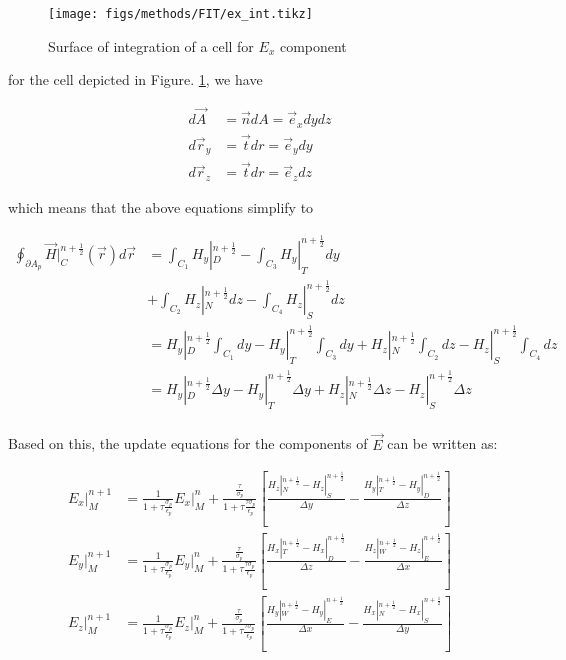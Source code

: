             \begin{figure}[!ht]
                \centering
                \texttt{[image: figs/methods/FIT/ex\_int.tikz]}
                \caption{Surface of integration of a cell for $E_x$ component}
                \label{fig:Ex_Int}
            \end{figure}

            for the cell depicted in Figure. \ref{fig:Ex_Int}, we have

            \begin{align}
                d\vec{A} &= \vec{n}dA = \vec{e}_xdydz \\
                d\vec{r}_y &= \vec{t}dr = \vec{e}_ydy \\
                d\vec{r}_z &= \vec{t}dr = \vec{e}_zdz
            \end{align}

            which means that the above equations simplify to

            \begin{align}
                \oint_{\partial A_p} \vec{H}|^{n+\frac{1}{2}}_{C}(\vec{r})d\vec{r} &= \int_{C_1}H_y|_D^{n+\frac{1}{2}} - \int_{C_3} H_y|_T^{n+\frac{1}{2}}dy \\
                    &+\int_{C_2}H_z|_{N}^{n+\frac{1}{2}}dz - \int_{C_4}H_z|_{S}^{n+\frac{1}{2}}dz \\
                    &= H_y|_D^{n+\frac{1}{2}}\int_{C_1}dy - H_y|_T^{n+\frac{1}{2}} \int_{C_3} dy +H_z|_{N}^{n+\frac{1}{2}}\int_{C_2}dz - H_z|_{S}^{n+\frac{1}{2}}\int_{C_4}dz\\
                    &= H_y|_D^{n+\frac{1}{2}}\Delta y - H_y|_T^{n+\frac{1}{2}} \Delta y +H_z|_{N}^{n+\frac{1}{2}}\Delta z - H_z|_{S}^{n+\frac{1}{2}}\Delta z\\
            \end{align}

            Based on this, the update equations for the components of $\vec{E}$ can be written as:

            \begin{align}
                E_x|_M^{n+1} &= \frac{1}{1+\tau\frac{\sigma_p}{\epsilon_p}}E_x|_M^n
                    + \frac{\frac{\tau}{\sigma_p}}{1+\tau\frac{\tau\sigma_p}{\epsilon_p}}\left[\frac{H_z|_N^{n+\frac{1}{2}}-H_z|_S^{n+\frac{1}{2}}}{\Delta y}
                    - \frac{H_y|_T^{n+\frac{1}{2}} - H_y|_D^{n+\frac{1}{2}}}{\Delta z}\right]\\
                E_y|_M^{n+1} &= \frac{1}{1+\tau\frac{\sigma_p}{\epsilon_p}}E_y|_M^n
                    + \frac{\frac{\tau}{\sigma_p}}{1+\tau\frac{\tau\sigma_p}{\epsilon_p}}\left[\frac{H_x|_T^{n+\frac{1}{2}}-H_x|_D^{n+\frac{1}{2}}}{\Delta z}
                    - \frac{H_z|_W^{n+\frac{1}{2}} - H_z|_E^{n+\frac{1}{2}}}{\Delta x}\right]\\
                E_z|_M^{n+1} &= \frac{1}{1+\tau\frac{\sigma_p}{\epsilon_p}}E_z|_M^n
                    + \frac{\frac{\tau}{\sigma_p}}{1+\tau\frac{\tau\sigma_p}{\epsilon_p}}\left[\frac{H_y|_W^{n+\frac{1}{2}}-H_y|_E^{n+\frac{1}{2}}}{\Delta x}
                    - \frac{H_x|_N^{n+\frac{1}{2}} - H_x|_S^{n+\frac{1}{2}}}{\Delta y}\right]
            \end{align}

